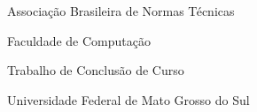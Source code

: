 \documentclass[
	12pt,				%
	openright,			%
	oneside,			%
	a4paper,			%
	english,			%
	brazil,				%
	]{abntex2}
\begin{document}
\listoftables*
\cleardoublepage

\begin{siglas}
  \item[ABNT] Associação Brasileira de Normas Técnicas
  \item[FACOM] Faculdade de Computação
  \item[TCC] Trabalho de Conclusão de Curso
  \item[UFMS] Universidade Federal de Mato Grosso do Sul
  \item[<SIGLA>] <Significado da sigla>
\end{siglas}


\tableofcontents*
\clearpage


\textual












%
\end{document}
